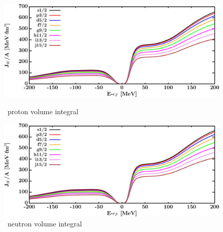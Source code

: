 \begin{figure}[hbtp]
    \centering
    \begin{minipage}{0.42\textwidth}
        \centering
        \includegraphics[width=\textwidth]{figures/ca40_protonVolumeIntegrals.png}
        \caption*{\caForty\ proton volume integral}
        \label{DOMFitData_ca40_proton_potentialIntegral}
    \end{minipage}\hspace{6pt}
    \begin{minipage}{0.42\textwidth}
        \centering
        \includegraphics[width=\textwidth]{figures/ca40_neutronVolumeIntegrals.png}
        \caption*{\caForty\ neutron volume integral}
        \label{DOMFitData_ca40_neutron_potentialIntegral}
    \end{minipage}
\end{figure}
